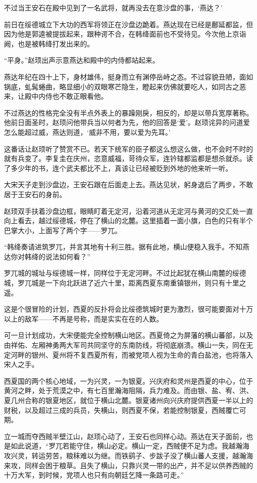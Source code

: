 不过当王安石在殿中见到了一名武将，就再没去在意沙盘的事，‘燕达？’

前日在绥德城立下大功的西军将领正在沙盘边跪着。燕达现在已经是鄜延都监，但因为他是郭逵被提拔起来，跟种谔不合，在韩绛面前也不受待见。今次他上京诣阙，也是被韩绛打发出来的。

“平身。”赵顼出声示意燕达和殿中的内侍都站起来。

燕达年纪在四十上下，身材雄伟，挺身而立有渊停岳峙之态。不过容貌丑陋，面如锅底，虬髯蜷曲，略显细小的双眼寒芒隐生，瞪起来仿佛就要吃人，如同古之恶来，让殿中内侍也不敢正眼看他。

不过燕达的性格完全没有半点外表上的暴躁刚戾，相反的，却是以带兵宽厚著称。他前日面圣时，赵顼问他带兵当以何者为先，他的回答是‘爱’。赵顼诧异的问道爱怎么能超过威，燕达则道，‘威非不用，要以爱为先耳。’

这番话让赵顼听了赞赏不已。若天下统军的臣子都这么想这么做，也不会时不时的就有兵变了。李复圭在庆州，恣意威福，苛待众军，连钤辖都监都是想杀就杀。读了多少年的书，连个武夫都比不上，真该让已经被贬到外地的他来听一听。

大宋天子走到沙盘边，王安石跟在后面走上去。燕达见状，躬身退后了两步，不敢居于王安石的身前。

赵顼双手扶着沙盘边框，眼睛盯着无定河，沿着河道从无定河与黄河的交汇处一直向上看去，越过绥德城，停在了横山的北麓。这里插着一面小旗，白色的只有半个巴掌大小，上面写了两个字——罗兀。

“韩绛奏请进筑罗兀，并言其地有十利三胜。据有此地，横山便稳入我手。不知燕达你对韩绛的说法如何看？”

罗兀城的城址与绥德城一样，同样位于无定河畔。不过比起犹在横山南麓的绥德城，罗兀城是一下向北跃进了近六十里，距离西夏东南重镇银州，则只有十里之遥。

这是个很冒险的计划，西夏的反扑将会比绥德筑城时更为激烈，很可能要面对十万以上的敌军——不再是号称，而是实实在在的人数。

可一旦计划成功，大宋便能完全控制横山地区。西夏倚之为屏藩的横山蕃部，以及由祥佑、左厢神勇两大军司共同坚守的东南防线，将彻底崩溃。横山一失，同在无定河畔的银州、夏州将不复西夏所有，而被党项人视为生命的青白盐池，也将落入宋人之手。

西夏国的两个核心地域，一为兴灵，一为银夏。兴庆府和灵州是西夏的中心，位于黄河之畔，处于荒漠之中，有七百里瀚海阻隔，兵力难及。而由银、盐、宥、洪、夏几州合称的银夏地区，就位于横山北麓。银夏诸州向兴庆府提供西夏一半以上的财税，以及超过三成的兵员，失横山，则西夏不保，若能控制银夏，西贼覆亡可期。

立一城而夺西贼半壁江山，赵顼心动了，王安石也同样心动。燕达在天子面前，也是如此说道，“罗兀若能守住，横山必定。横山一定，西贼便不足为虑。我越瀚海攻兴灵，转运劳苦，粮秣难以为继。而铁鹞子、步跋子没了横山蕃人支援，越瀚海来攻，同样会困于粮草。且失了横山，只靠兴灵一带的出产，并不足以供养西贼的十万大军，到时候，党项人也只有向朝廷乞降一条路可走。”

